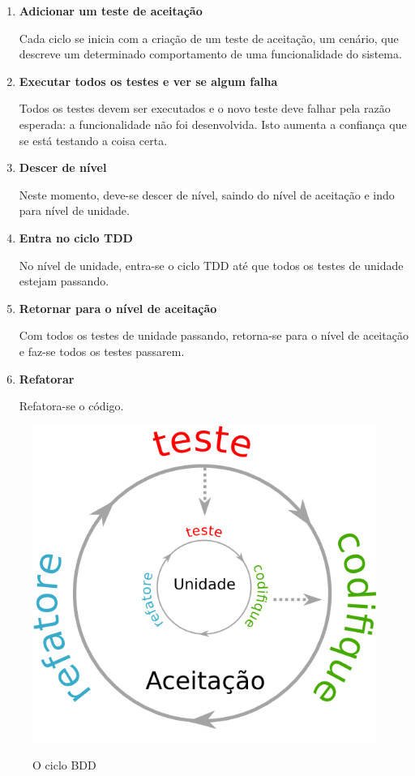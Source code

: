 \begin{enumerate}
\item \textbf{Adicionar um teste de aceitação}

Cada ciclo se inicia com a criação de um teste de aceitação, um cenário, que descreve um determinado comportamento de uma funcionalidade do sistema.

\item \textbf{Executar todos os testes e ver se algum falha}

Todos os testes devem ser executados e o novo teste deve falhar pela razão esperada: a funcionalidade não foi desenvolvida. Isto aumenta a confiança que se está testando a coisa certa.

\item \textbf{Descer de nível}

Neste momento, deve-se descer de nível, saindo do nível de aceitação e indo para  nível de unidade.

\item \textbf{Entra no ciclo TDD}

No nível de unidade, entra-se o ciclo TDD até que todos os testes de unidade estejam passando.

\item \textbf{Retornar para o nível de aceitação}

Com todos os testes de unidade passando, retorna-se para o nível de aceitação e faz-se todos os testes passarem.

\item \textbf{Refatorar}

Refatora-se o código.

\end{enumerate}

\begin{figure}[h]
  \center
  \caption{O ciclo BDD}
  \includegraphics[scale=0.45]{images/ciclo-bdd}
  \label{img:ciclo-bdd}
\end{figure}


